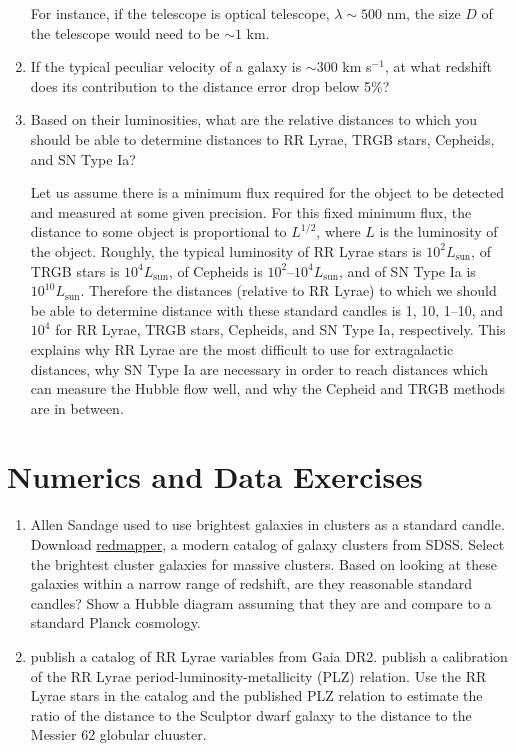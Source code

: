 \begin{enumerate}
\begin{answer}
For instance, if the telescope is optical telescope, $\lambda \sim
500$ nm, the size $D$ of the telescope would need to be $\sim 1$ km.
\end{answer}

\item If the typical peculiar velocity of a galaxy is $\sim 300$ km
    s$^{-1}$, at what redshift does its contribution to the distance
   error drop below 5\%?
\item Based on their luminosities, what are the relative distances to
   which you should be able to determine distances to RR Lyrae,
   TRGB stars, Cepheids, and SN Type Ia?

\begin{answer}
Let us assume there is a minimum flux required for the object to be
detected and measured at some given precision. For this fixed minimum
flux, the distance to some object is proportional to $L^{1/2}$, where
$L$ is the luminosity of the object. Roughly, the typical luminosity
of RR Lyrae stars is $10^2 L_\text{sun}$, of TRGB stars is $10^4
L_\text{sun}$, of Cepheids is $10^2$--$10^4 L_\text{sun}$, and of SN
Type Ia is $10^{10}L_\text{sun}$. Therefore the distances (relative to
RR Lyrae) to which we should be able to determine distance with these
standard candles is 1, 10, 1--10, and $10^4$ for RR Lyrae, TRGB stars,
Cepheids, and SN Type Ia, respectively. This explains why RR Lyrae are
the most difficult to use for extragalactic distances, why SN Type Ia
are necessary in order to reach distances which can measure the Hubble
flow well, and why the Cepheid and TRGB methods are in between. 
\end{answer}

\end{enumerate} 

\section{Numerics and Data Exercises}

\begin{enumerate}
\item Allen Sandage used to use brightest galaxies in clusters as a
   standard
   candle. Download \href{http://risa.stanford.edu/redmapper/}{redmapper},
   a modern catalog of galaxy clusters from SDSS. Select the brightest
   cluster galaxies for massive clusters. Based on looking at these
   galaxies within a narrow range of redshift, are they reasonable
   standard candles? Show a Hubble diagram assuming that they are and
   compare to a standard Planck cosmology.
\item \citet{clementini18a} publish a catalog of RR Lyrae variables
   from Gaia DR2. \citet{muraveva18a} publish a calibration of the RR
   Lyrae period-luminosity-metallicity (PLZ) relation. Use the RR
   Lyrae stars in the catalog and the published PLZ relation to
   estimate the ratio of the distance to the Sculptor dwarf galaxy to
   the distance to the Messier 62 globular cluuster.
\end{enumerate}


  
